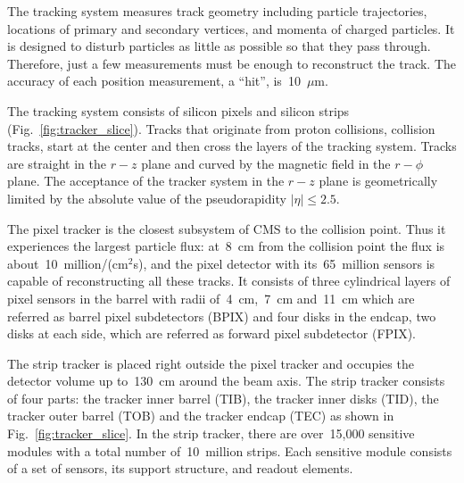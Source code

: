 The tracking system measures track geometry including particle trajectories, locations of primary and secondary vertices, and momenta of charged particles. It is designed to disturb particles as little as possible so that they pass through. Therefore, just a few measurements must be enough to reconstruct the track. The accuracy of each position measurement, a ``hit'', is~10~$\mu$m.

The tracking system consists of silicon pixels and silicon strips (Fig.~\ref{fig:tracker_slice}). Tracks that originate from proton collisions, collision tracks, start at the center and then cross the layers of the tracking system. Tracks are straight in the $r-z$ plane and curved by the magnetic field in the $r-\phi$ plane. The acceptance of the tracker system in the $r-z$ plane is geometrically limited by the absolute value of the pseudorapidity $|\eta| \leq 2.5$.

The pixel tracker is the closest subsystem of CMS to the collision point. Thus it experiences the largest particle flux: at~8~cm from the collision point the flux is about~10~million/(cm$^2$s), and the pixel detector with its~65~million sensors is capable of reconstructing all these tracks. It consists of three cylindrical layers of pixel sensors in the barrel with radii of~4~cm,~7~cm and~11~cm which are referred as barrel pixel subdetectors (BPIX) and four disks in the endcap, two disks at each side, which are referred as forward pixel subdetector (FPIX). 


The strip tracker is placed right outside the pixel tracker and occupies the detector volume up to~130~cm around the beam axis. The strip tracker consists of four parts: the tracker inner barrel (TIB), the tracker inner disks (TID), the tracker outer barrel (TOB) and the tracker endcap (TEC) as shown in Fig.~\ref{fig:tracker_slice}. In the strip tracker, there are over~15,000 sensitive modules with a total number of~10~million strips. Each sensitive module consists of a set of sensors, its support structure, and readout elements.



